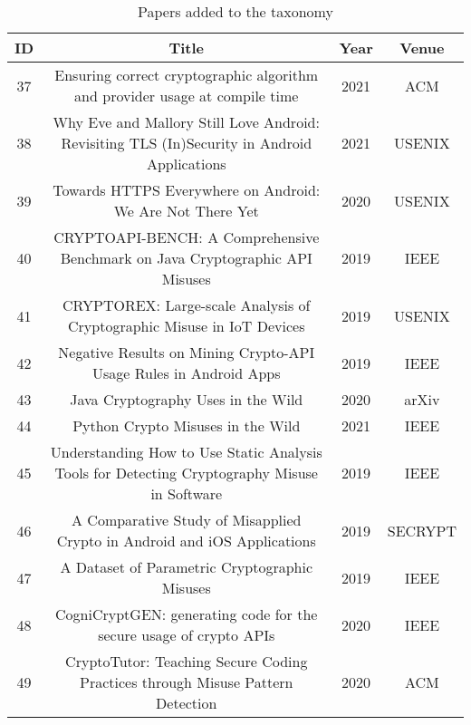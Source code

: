 \begin{table*}
    
    \centering
    \tiny
    \caption{\small Papers added to the taxonomy}
    \label{table:new_papers}
    \begin{tabular}{ |c|c|c|c| } 
     \hline
    ID & Title & Year & Venue \\
    \hline
    37 & Ensuring correct cryptographic algorithm and provider usage at compile time \cite{Xing_Cheng_Dietl_2021} & 2021 & ACM \\
    \hline
    38 & Why Eve and Mallory Still Love Android: Revisiting TLS (In)Security in Android Applications \cite{oha+21} & 2021 & USENIX \\
    \hline
    39 & Towards HTTPS Everywhere on Android: We Are Not There Yet \cite{Possemato_Fratantonio} & 2020 & USENIX \\
    \hline
    40 & CRYPTOAPI-BENCH: A Comprehensive Benchmark on Java Cryptographic API Misuses \cite{Afrose_Rahaman_Yao_2019} & 2019 & IEEE \\
    \hline
    41 & CRYPTOREX: Large-scale Analysis of Cryptographic Misuse in IoT Devices \cite{ZCD+19} & 2019 & USENIX \\
    \hline
    42 & Negative Results on Mining Crypto-API Usage Rules in Android Apps \cite{GKL+19} & 2019 & IEEE \\
    \hline
    43 & Java Cryptography Uses in the Wild \cite{Hazhirpasand_Ghafari_Nierstrasz_2020} & 2020 & arXiv \\
    \hline
    44 & Python Crypto Misuses in the Wild \cite{Wickert_Baumgartner_Breitfelder_Mezini_2021} & 2021 & IEEE \\
    \hline
    45 & Understanding How to Use Static Analysis Tools for Detecting Cryptography Misuse in Software \cite{BDA+19} & 2019 & IEEE \\
    \hline
    46 & A Comparative Study of Misapplied Crypto in Android and iOS Applications \cite{Feichtner_2019} & 2019 & SECRYPT \\
    \hline
    47 & A Dataset of Parametric Cryptographic Misuses \cite{Wickert_Reif_Eichberg_Dodhy_Mezini_2019} & 2019 & IEEE \\
    \hline
    48 & CogniCryptGEN: generating code for the secure usage of crypto APIs \cite{Kruger_Ali_Bodden_2020} & 2020 & IEEE \\
    \hline
    49 & CryptoTutor: Teaching Secure Coding Practices through Misuse Pattern Detection \cite{Singleton_Zhao_Song_Siy_2020} & 2020 & ACM \\

\end{tabular}
\end{table*}
